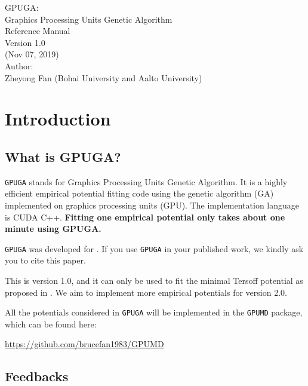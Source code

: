 \documentclass[12pt,a4paper]{report}
\begin{document}
\begin{center}
  \huge
  {
   \vspace*{1.0cm}
   GPUGA: \\
   Graphics Processing Units Genetic Algorithm \\
   \vspace*{1.0cm}
   Reference Manual\\
   \vspace*{1.0cm}
   Version 1.0 \\
   \vspace*{1.0cm}
   (Nov 07, 2019)\\
  \vspace*{2.0cm}
  }
  \large
  {
  Author: \\
  Zheyong Fan (Bohai University and Aalto University)\\
  }
  \vspace*{1.0cm}
\end{center}

\tableofcontents

\chapter{Introduction\label{chapter:introduction}}

\section{What is GPUGA?}

\verb"GPUGA" stands for Graphics Processing Units Genetic Algorithm. It is a highly efficient empirical potential fitting code using the genetic algorithm (GA) implemented on graphics processing units (GPU). The implementation language is CUDA C++. \textbf{Fitting one empirical potential only takes about one minute using GPUGA. }

\verb"GPUGA" was developed for \cite{fan2019arxiv}. If you use \verb"GPUGA" in your published work, we kindly ask you to cite this paper.

This is version 1.0, and it can only be used to fit the minimal Tersoff potential as proposed in \cite{fan2019arxiv}. We aim to implement more empirical potentials for version 2.0.

All the potentials considered in \verb"GPUGA" will be implemented in the \verb"GPUMD" package, which can be found here:

\url{https://github.com/brucefan1983/GPUMD}


\section{Feedbacks}
\end{document}
